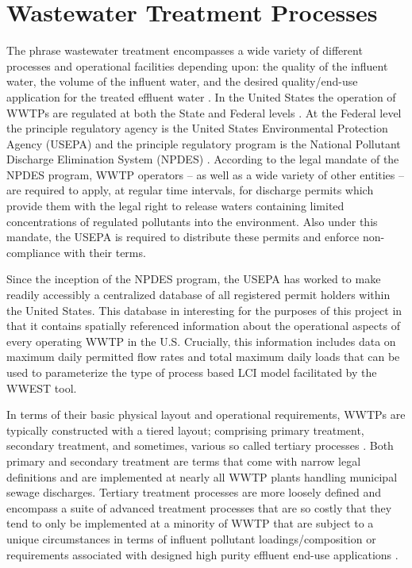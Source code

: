\section{Wastewater Treatment Processes}

The phrase wastewater treatment encompasses a wide variety of different processes and operational facilities depending upon: the quality of the influent water, the volume of the influent water, and the desired quality/end-use application for the treated effluent water \cite{Levine2004}. In the United States the operation of WWTPs are regulated at both the State and Federal levels \cite{Lautze2014}. At the Federal level the principle regulatory agency is the United States Environmental Protection Agency (USEPA) and the principle regulatory program is the National Pollutant Discharge Elimination System (NPDES) \cite{USEPA2012}. According to the legal mandate of the NPDES program, WWTP operators -- as well as a wide variety of other entities -- are required to apply, at regular time intervals, for discharge permits which provide them with the legal right to release waters containing limited concentrations of regulated pollutants into the environment. Also under this mandate, the USEPA is required to distribute these permits and enforce non-compliance with their terms.

Since the inception of the NPDES program, the USEPA has worked to make readily accessibly a centralized database of all registered permit holders within the United States. This database in interesting for the purposes of this project in that it contains spatially referenced information about the operational aspects of every operating WWTP in the U.S. \cite{NRC2008} Crucially, this information includes data on maximum daily permitted flow rates and total maximum daily loads that can be used to parameterize the type of process based LCI model facilitated by the WWEST tool.

In terms of their basic physical layout and operational requirements, WWTPs are typically constructed with a tiered layout; comprising primary treatment, secondary treatment, and sometimes, various so called tertiary processes \cite{Stander1969,Adams1973,NRC2012}. Both primary and secondary treatment are terms that come with narrow legal definitions and are implemented at nearly all WWTP plants handling municipal sewage discharges. Tertiary treatment processes are more loosely defined and encompass a suite of advanced treatment processes that are so costly that they tend to only be implemented at a minority of WWTP that are subject to a unique circumstances in terms of influent pollutant loadings/composition or requirements associated with designed high purity effluent end-use applications \cite{CH2MHill2004,Horton2009}.


